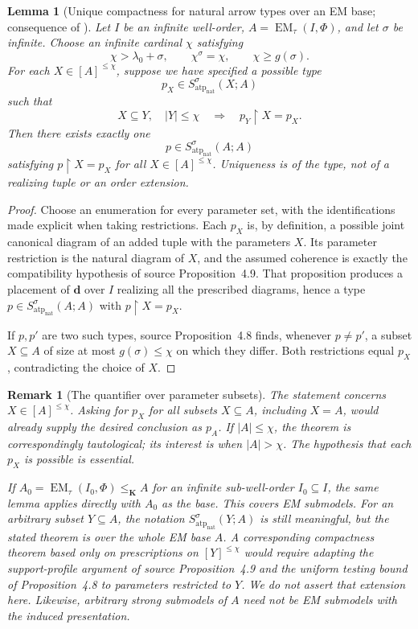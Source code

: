 \documentclass[11pt]{article}
\newcommand{\K}{\mathbf K}
\newcommand{\natatp}{\operatorname{atp}_{\mathrm{nat}}}
\newcommand{\EM}{\operatorname{EM}_{\tau}}
\newcommand{\bd}{\mathbf{d}}
\theoremstyle{plain}
\newtheorem{lemma}[definition]{Lemma}
\newtheorem{remark}[definition]{Remark}
\begin{document}
\begin{lemma}[Unique compactness for natural arrow types over an EM base;
consequence of {\cite[Propositions 4.8--4.9]{oai-ecc}}]
\label{lem:unique-placed-compactness}
Let $I$ be an infinite well-order,
$A=\EM(I,\Phi)$, and let $\sigma$ be infinite.
Choose an infinite cardinal $\chi$ satisfying
\[
\chi>\lambda_0+\sigma,\qquad
\chi^\sigma=\chi,\qquad
\chi\geq g(\sigma).
\]
For each $X\in[A]^{\leq\chi}$, suppose we
have specified a \emph{possible} type
\[
p_X\in S^\sigma_{\natatp}(X;A)
\]
such that
\[
X\subseteq Y,\quad |Y|\leq\chi
\quad\Longrightarrow\quad
p_Y\restriction X=p_X.
\]
Then there exists exactly one
\[
p\in S^\sigma_{\natatp}(A;A)
\]
satisfying $p\restriction X=p_X$
for all $X\in[A]^{\leq\chi}$.
Uniqueness is of the \emph{type}, not of
a realizing tuple or an order extension.
\end{lemma}
\begin{proof}
Choose an enumeration for every parameter set,
with the identifications made explicit when
taking restrictions. Each $p_X$ is, by definition,
a possible joint canonical diagram of an added
tuple with the parameters $X$. Its parameter
restriction is the natural diagram of $X$,
and the assumed coherence is exactly the
compatibility hypothesis of source
Proposition~4.9. That proposition produces
a placement of $\bd$ over $I$ realizing all
the prescribed diagrams, hence a type
$p\in S^\sigma_{\natatp}(A;A)$ with
$p\restriction X=p_X$.

If $p,p'$ are two such types, source
Proposition~4.8 finds, whenever $p\ne p'$,
a subset $X\subseteq A$ of size at most
$g(\sigma)\leq\chi$ on which they differ.
Both restrictions equal $p_X$,
contradicting the choice of $X$.
\end{proof}

\begin{remark}[The quantifier over parameter subsets]
The statement concerns $X\in[A]^{\leq\chi}$.
Asking for $p_X$ for \emph{all} subsets
$X\subseteq A$, including $X=A$, would
already supply the desired conclusion
as $p_A$. If $|A|\leq\chi$, the theorem
is correspondingly tautological; its
interest is when $|A|>\chi$.
The hypothesis that each $p_X$ is
\emph{possible} is essential.

If $A_0=\EM(I_0,\Phi)\leq_\K A$ for
an infinite sub-well-order $I_0\subseteq I$,
the same lemma applies directly with
$A_0$ as the base. This covers EM submodels.
For an arbitrary subset $Y\subseteq A$,
the notation $S^\sigma_{\natatp}(Y;A)$ is
still meaningful, but the stated theorem
is over the \emph{whole EM base} $A$.
A corresponding compactness theorem based
only on prescriptions on $[Y]^{\leq\chi}$
would require adapting the support-profile
argument of source Proposition~4.9
and the uniform testing bound of
Proposition~4.8 to parameters restricted
to $Y$. We do not assert that extension
here. Likewise, arbitrary strong submodels
of $A$ need not be EM submodels with the
induced presentation.
\end{remark}
\end{document}
